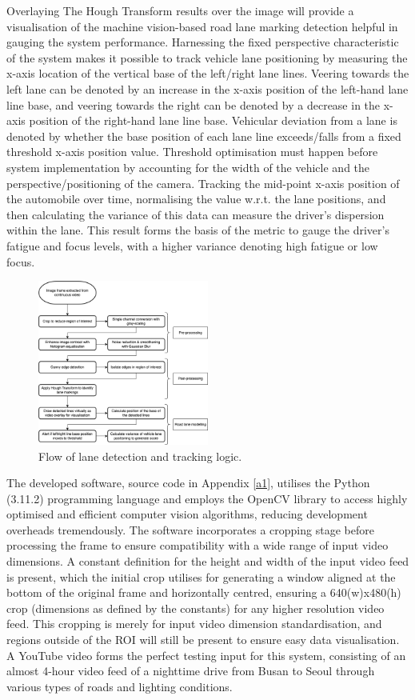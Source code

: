 \documentclass[9pt,conference]{IEEEtran}
\begin{document}
Overlaying The Hough Transform results over the image will provide a visualisation of the machine vision-based road lane marking detection helpful in gauging the system performance. Harnessing the fixed perspective characteristic of the system makes it possible to track vehicle lane positioning by measuring the x-axis location of the vertical base of the left/right lane lines. Veering towards the left lane can be denoted by an increase in the x-axis position of the left-hand lane line base, and veering towards the right can be denoted by a decrease in the x-axis position of the right-hand lane line base. Vehicular deviation from a lane is denoted by whether the base position of each lane line exceeds/falls from a fixed threshold x-axis position value. Threshold optimisation must happen before system implementation by accounting for the width of the vehicle and the perspective/positioning of the camera. Tracking the mid-point x-axis position of the automobile over time, normalising the value w.r.t. the lane positions, and then calculating the variance of this data can measure the driver's dispersion within the lane. This result forms the basis of the metric to gauge the driver's fatigue and focus levels, with a higher variance denoting high fatigue or low focus.

\begin{figure}[htbp]
    \centerline{\includegraphics[width=0.5\textwidth]{assets/lane-detection-flow.png}}
    \caption{Flow of lane detection and tracking logic.}
    \label{f1}
\end{figure}

The developed software, source code in Appendix \ref{a1}, utilises the Python (3.11.2) programming language and employs the OpenCV library to access highly optimised and efficient computer vision algorithms, reducing development overheads tremendously. The software incorporates a cropping stage before processing the frame to ensure compatibility with a wide range of input video dimensions. A constant definition for the height and width of the input video feed is present, which the initial crop utilises for generating a window aligned at the bottom of the original frame and horizontally centred, ensuring a 640(w)x480(h) crop (dimensions as defined by the constants) for any higher resolution video feed. This cropping is merely for input video dimension standardisation, and regions outside of the ROI will still be present to ensure easy data visualisation. A YouTube video \cite{b8} forms the perfect testing input for this system, consisting of an almost 4-hour video feed of a nighttime drive from Busan to Seoul through various types of roads and lighting conditions.
\end{document}
